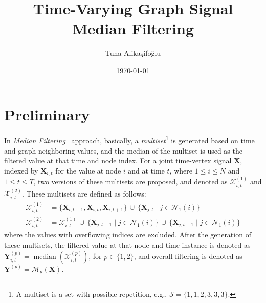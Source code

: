 \documentclass[a4paper,10pt,conference]{IEEEtran}
\title{Time-Varying Graph Signal Median Filtering}
\author{Tuna Alikaşifoğlu}
\date{\today}
\begin{document}
\maketitle

\section{Preliminary}
In \textit{Median Filtering}~\cite{median} approach, basically, a \textit{multiset}\footnote{A multiset is a set with possible repetition, e.g., \(\mathcal{S}=\{1,1,2,3,3,3\}\).} is generated based on time and graph neighboring values, and the median of the multiset is used as the filtered value at that time and node index. For a joint time-vertex signal $\mathbf{X}$, indexed by $\mathbf{X}_{i,t}$ for the value at node $i$ and at time $t$, where $1\leq i \leq N$ and $1\leq t \leq T$, two versions of these multisets are proposed, and denoted as $\mathcal{X}_{i,t}^{(1)}$ and $\mathcal{X}_{i,t}^{(2)}$. These multisets are defined as follows:
\begin{align}
	\mathcal{X}_{i,t}^{(1)} & = \{\mathbf{X}_{i,t-1},\mathbf{X}_{i,t},\mathbf{X}_{i,t+1}\}\,\cup\,\{\mathbf{X}_{j,t}\mid j\in\mathcal{N}_{1}(i)\}                         \\
	\mathcal{X}_{i,t}^{(2)} & = \mathcal{X}_{i,t}^{(1)}\,\cup\,\{\mathbf{X}_{j,t-1}\mid j\in\mathcal{N}_{1}(i)\}\,\cup\,\{\mathbf{X}_{j,t+1}\mid j\in\mathcal{N}_{1}(i)\}
\end{align}
where the values with overflowing indices are excluded. After the generation of these multisets, the filtered value at that node and time instance is denoted as $\mathbf{Y}_{i,t}^{(p)}=\operatorname{median}(\mathcal{X}_{i,t}^{(p)})$, for $p\in\{1,2\}$, and overall filtering is denoted as $\mathbf{Y}^{(p)} = \mathcal{M}_{p}(\mathbf{X})$.
\end{document}
